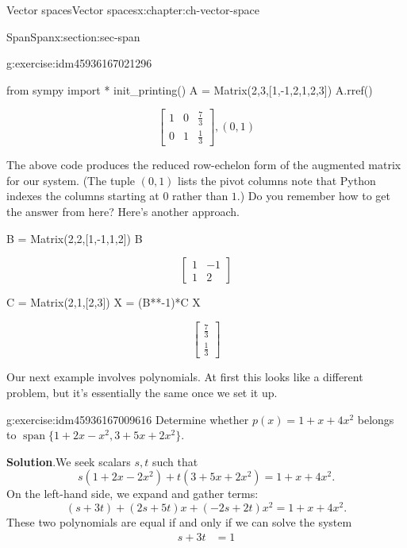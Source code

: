 \documentclass[oneside,10pt,]{book}
\newcommand{\blocktitlefont}{\relax}
\numberwithin{equation}{section}
\newcommand{\spn}{\operatorname{span}}
\newcommand{\bbm}{\begin{bmatrix}}
\newcommand{\ebm}{\end{bmatrix}}
\newcommand{\amp}{&}
\begin{document}
\begin{chapterptx}{Vector spaces}{}{Vector spaces}{}{}{x:chapter:ch-vector-space}
\begin{sectionptx}{Span}{}{Span}{}{}{x:section:sec-span}
\begin{inlineexercise}{}{g:exercise:idm45936167021296}
\begin{sageinput}
from sympy import *
init_printing()
A = Matrix(2,3,[1,-1,2,1,2,3])
A.rref()
\end{sageinput}
\begin{sageoutput}
\begin{equation*}
  \bbm 1\amp 0\amp \frac73\\0\amp 1\amp \frac13\ebm, (0,1)
\end{equation*}
\end{sageoutput}
The above code produces the reduced row-echelon form of the augmented matrix for our system. (The tuple \((0,1)\) lists the pivot columns \textemdash{} note that Python indexes the columns starting at \(0\) rather than \(1\).) Do you remember how to get the answer from here? Here's another approach.%
\begin{sageinput}
B = Matrix(2,2,[1,-1,1,2])
B
\end{sageinput}
\begin{sageoutput}
\[\bbm 1\amp -1\\1\amp 2\ebm\]
\end{sageoutput}
\begin{sageinput}
C = Matrix(2,1,[2,3])
X = (B**-1)*C
X
\end{sageinput}
\begin{sageoutput}
\[\bbm \frac 73\\\frac13\ebm\]
\end{sageoutput}
\end{inlineexercise}%
Our next example involves polynomials. At first this looks like a different problem, but it's essentially the same once we set it up.%
\begin{inlineexercise}{}{g:exercise:idm45936167009616}%
Determine whether \(p(x)=1+x+4x^2\) belongs to \(\spn\{1+2x-x^2,3+5x+2x^2\}\).%
\par\smallskip%
\noindent\textbf{\blocktitlefont Solution}.\label{g:solution:idm45936167008176}{}\hypertarget{g:solution:idm45936167008176}{}\quad{}We seek scalars \(s,t\) such that%
\begin{equation*}
s(1+2x-2x^2)+t(3+5x+2x^2)=1+x+4x^2\text{.}
\end{equation*}
On the left-hand side, we expand and gather terms:%
\begin{equation*}
(s+3t)+(2s+5t)x+(-2s+2t)x^2 = 1+x+4x^2\text{.}
\end{equation*}
These two polynomials are equal if and only if we can solve the system%
\begin{align*}
s+3t \amp = 1 \\

\end{align*}
\end{inlineexercise}
\end{sectionptx}
\end{chapterptx}
\end{document}
